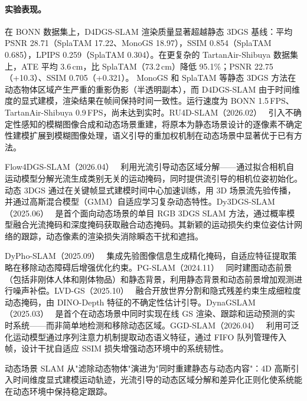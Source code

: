 \paragraph{实验表现。}
在 BONN 数据集上，D4DGS-SLAM 渲染质量显著超越静态 3DGS 基线：平均 PSNR 28.71（SplaTAM 17.22、MonoGS 18.97），SSIM 0.854（SplaTAM 0.685），LPIPS 0.259（SplaTAM 0.304）。在更复杂的 TartanAir-Shibuya 数据集上，ATE 平均 3.6\,cm，比 SplaTAM（73.2\,cm）降低 95.1\%；PSNR 22.75（+10.3）、SSIM 0.705（+0.321）。 MonoGS 和 SplaTAM 等静态 3DGS 方法在动态物体区域产生严重的重影伪影（半透明副本），而 D4DGS-SLAM 由于时间维度的显式建模，渲染结果在帧间保持时间一致性。运行速度为 BONN 1.5\,FPS、TartanAir-Shibuya 0.9\,FPS，尚未达到实时。RU4D-SLAM（2026.02）~\cite{2602_20807} 引入不确定性感知的模糊图像合成和动态场景重建，将原本为静态场景设计的逐像素不确定性建模扩展到模糊图像处理，语义引导的重加权机制在动态场景中显著优于已有方法。

Flow4DGS-SLAM（2026.04）~\cite{2604_22339} 利用光流引导动态区域分解——通过拟合相机自运动模型分解光流生成类别无关的运动掩码，同时提供流引导的相机位姿初始化。动态 3DGS 通过在关键帧显式建模时间中心加速训练，用 3D 场景流先验传播，并通过高斯混合模型（GMM）自适应学习复杂动态特性。Dy3DGS-SLAM（2025.06）~\cite{2506_05965} 是首个面向动态场景的单目 RGB 3DGS SLAM 方法，通过概率模型融合光流掩码和深度掩码获取融合动态掩码。其新颖的运动损失约束位姿估计网络的跟踪，动态像素的渲染损失消除瞬态干扰和遮挡。

DyPho-SLAM（2025.09）~\cite{2509_00741} 集成先验图像信息生成精化掩码，自适应特征提取策略在移除动态障碍后增强优化约束。PG-SLAM（2024.11）~\cite{2411_15800} 同时建图动态前景（包括非刚体人体和刚体物品）和静态背景，利用静态背景和动态前景增加观测进行噪声补偿。LVD-GS（2025.10）~\cite{2510_22669} 融合开放世界分割和隐式残差约束生成细粒度动态掩码，由 DINO-Depth 特征的不确定性估计引导。DynaGSLAM（2025.03）~\cite{2503_11979} 是首个在动态场景中同时实现在线 GS 渲染、跟踪和运动预测的实时系统——而非简单地检测和移除动态区域。GGD-SLAM（2026.04）~\cite{2604_12837} 利用可泛化运动模型通过序列注意力机制提取动态语义特征，通过 FIFO 队列管理传入帧，设计干扰自适应 SSIM 损失增强动态环境中的系统韧性。

\begin{takeaway}
动态场景 SLAM 从"滤除动态物体"演进为"同时重建静态与动态内容"：4D 高斯引入时间维度显式建模运动轨迹，光流引导的动态区域分解和差异化正则化使系统能在动态环境中保持稳定跟踪。
\end{takeaway}



